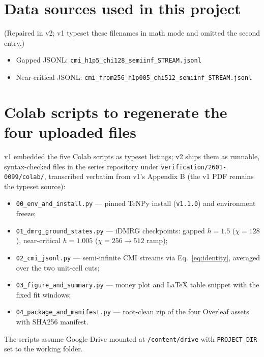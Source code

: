\documentclass[11pt]{article}
\begin{document}
\appendix

\section{Data sources used in this project}
\label{app:data}

(Repaired in v2; v1 typeset these filenames in math mode and omitted the
second entry.)

\begin{itemize}
\item Gapped JSONL: \texttt{cmi\_h1p5\_chi128\_semiinf\_STREAM.jsonl}
\item Near-critical JSONL:
\texttt{cmi\_from256\_h1p005\_chi512\_semiinf\_STREAM.jsonl}
\end{itemize}

\section{Colab scripts to regenerate the four uploaded files}
\label{app:scripts}

v1 embedded the five Colab scripts as typeset listings; v2 ships them as
runnable, syntax-checked files in the series repository under
\texttt{verification/2601-0099/colab/}, transcribed verbatim from v1's
Appendix B (the v1 PDF remains the typeset source):

\begin{itemize}
\item \texttt{00\_env\_and\_install.py} --- pinned TeNPy install
(\texttt{v1.1.0}) and environment freeze;
\item \texttt{01\_dmrg\_ground\_states.py} --- iDMRG checkpoints:
gapped $h{=}1.5$ ($\chi{=}128$), near-critical $h{=}1.005$
($\chi{=}256 \to 512$ ramp);
\item \texttt{02\_cmi\_jsonl.py} --- semi-infinite CMI streams via
Eq.~\eqref{eq:identity}, averaged over the two unit-cell cuts;
\item \texttt{03\_figure\_and\_summary.py} --- money plot and LaTeX
table snippet with the fixed fit windows;
\item \texttt{04\_package\_and\_manifest.py} --- root-clean zip of the
four Overleaf assets with SHA256 manifest.
\end{itemize}

The scripts assume Google Drive mounted at \texttt{/content/drive} with
\texttt{PROJECT\_DIR} set to the working folder.
\end{document}
